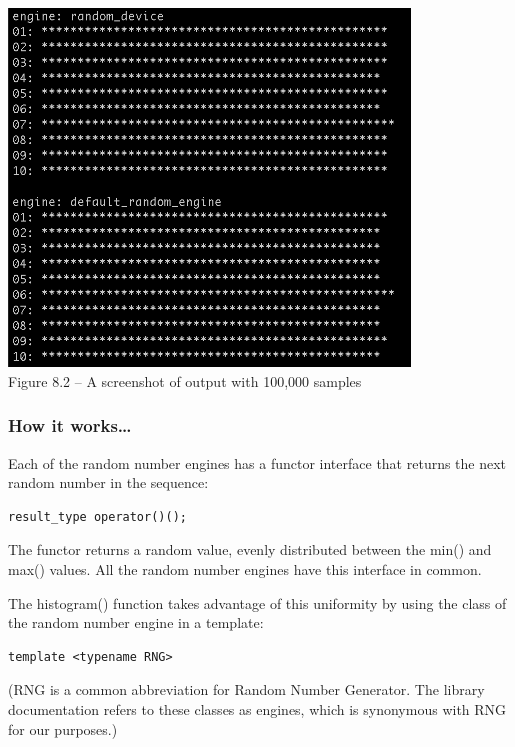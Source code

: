 \begin{itemize}
\begin{center}
\includegraphics[width=0.8\textwidth]{content/chapter8/images/2.png}\\
Figure 8.2 – A screenshot of output with 100,000 samples
\end{center}

\end{itemize}

\subsubsection{How it works…}

Each of the random number engines has a functor interface that returns the next random number in the sequence:

\begin{lstlisting}[style=styleCXX]
result_type operator()();
\end{lstlisting}

The functor returns a random value, evenly distributed between the min() and max() values. All the random number engines have this interface in common.

The histogram() function takes advantage of this uniformity by using the class of the random number engine in a template:

\begin{lstlisting}[style=styleCXX]
template <typename RNG>
\end{lstlisting}

(RNG is a common abbreviation for Random Number Generator. The library documentation refers to these classes as engines, which is synonymous with RNG for our purposes.) 

